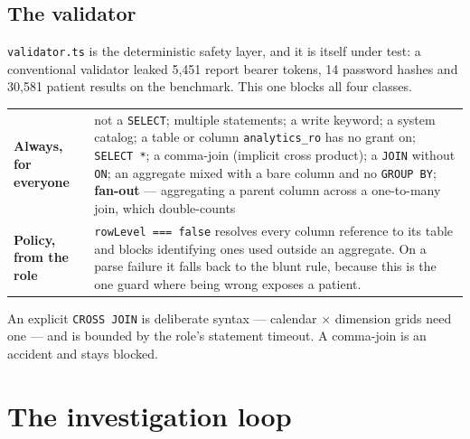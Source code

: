 \documentclass[11pt,a4paper]{report}
\newcommand{\file}[1]{\texttt{\small #1}}
\newcommand{\code}[1]{\texttt{\small #1}}
\begin{document}
\subsection{The validator}
\label{sec:validator}

\file{validator.ts} is the deterministic safety layer, and it is itself under test: a conventional
validator leaked 5{,}451 report bearer tokens, 14 password hashes and 30{,}581 patient results on
the benchmark. This one blocks all four classes.

\begin{center}
\small
\begin{tabular}{@{}p{3.4cm}p{11.4cm}@{}}
\toprule
\textbf{Always, for everyone} & not a \code{SELECT}; multiple statements; a write keyword; a system
 catalog; a table or column \code{analytics\_ro} has no grant on; \code{SELECT *}; a comma-join
 (implicit cross product); a \code{JOIN} without \code{ON}; an aggregate mixed with a bare column
 and no \code{GROUP BY}; \textbf{fan-out} --- aggregating a parent column across a one-to-many join,
 which double-counts\\[3pt]
\textbf{Policy, from the role} & \code{rowLevel === false} resolves every column reference to its
 table and blocks identifying ones used outside an aggregate. On a parse failure it falls back to
 the blunt rule, because this is the one guard where being wrong exposes a patient.\\
\bottomrule
\end{tabular}
\end{center}

\noindent An explicit \code{CROSS JOIN} is deliberate syntax --- calendar $\times$ dimension grids
need one --- and is bounded by the role's statement timeout. A comma-join is an accident and stays
blocked.

\section{The investigation loop}
\end{document}
